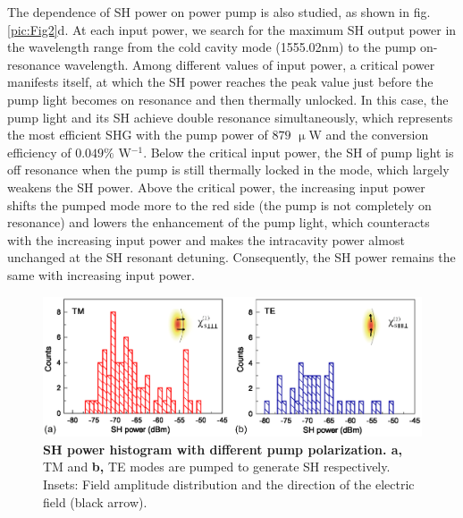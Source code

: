 \documentclass[a4paper,8pt,hyperref, twocolumn]{article}
\begin{document}
The dependence of SH power on power pump is also studied, as shown in fig.\ref{pic:Fig2}d. 
At each input power, we search for the maximum SH output power in the wavelength range from the cold cavity mode (1555.02nm) to the pump on-resonance wavelength. 
Among different values of input power, a critical power manifests itself, at which the SH power reaches the peak value just before the pump light becomes on resonance and then thermally unlocked. 
In this case, the pump light and its SH achieve double resonance simultaneously, which represents the most efficient SHG with the pump power of $879$ $\upmu$W and the conversion efficiency of $0.049\%$ W$^{-1}$.
Below the critical input power, the SH of pump light is off resonance when the pump is still thermally locked in the mode, which largely weakens the SH power.
Above the critical power, the increasing input power shifts the pumped mode more to the red side (the pump is not completely on resonance) and lowers the enhancement of the pump light, which counteracts with the increasing input power and makes the intracavity power almost unchanged at the SH resonant detuning. 
Consequently, the SH power remains the same with increasing input power.



\begin{figure}[!ht]
\includegraphics[width=18cm]{Fig3.eps}
\caption{\textbf{SH power histogram with different pump polarization. a, } TM and \textbf{b,} TE modes are pumped to generate SH respectively. Insets: Field amplitude distribution and the direction of the electric field (black arrow).}
\label{pic:Fig3}
\end{figure}
\end{document}
